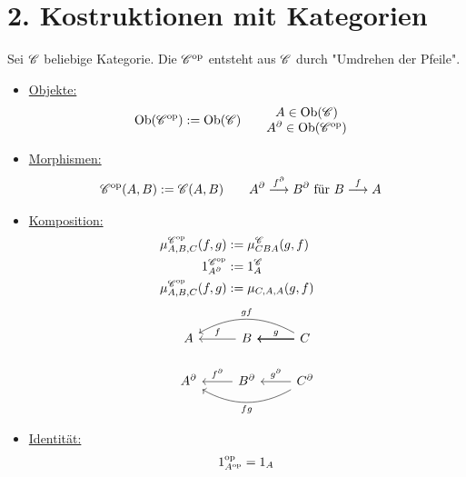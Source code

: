 
\chapter{2. Kostruktionen mit Kategorien}

\begin{definition}
	Sei $\mathscr C$ beliebige Kategorie.
	Die  $\mathscr C^{\text{op}}$ entsteht aus $\mathscr C$ durch "Umdrehen der Pfeile".
	\begin{itemize}
		\item \ul{Objekte:}
			\begin{align*}
				\operatorname{Ob}(\mathscr C^{\text{op}})&:=\operatorname{Ob}(\mathscr C)\qquad\begin{matrix}
						A\in\operatorname{Ob}(\mathscr C)\\
						A^\partial\in\operatorname{Ob}(\mathscr C^{\text{op}})
						\end{matrix}
			\end{align*}
		\item \ul{Morphismen:}
			\begin{align*}
				\mathscr C^{\text{op}}(A,B)&:=\mathscr C(A,B)\qquad
						A^\partial\overset{f^\partial}{\longrightarrow}B^\partial\text{ für }B\overset{f}{\longrightarrow}A
			\end{align*}
		\item \ul{Komposition:}
			\begin{align*}
				\mu_{A,B,C}^{\mathscr C^{\text{op}}}(f,g)&:=\mu_{CBA}^\mathscr C(g,f)\qquad\\
				1_{A^\partial}^{\mathscr C^{\text{op}}}&:=1_A^\mathscr C\\
				\mu_{A,B,C}^{\mathscr C^{\text{op}}}(f,g) &:= \mu_{C,A,A}(g,f)\\
			\end{align*}
		\begin{align*}
				\begin{tikzcd}[ampersand replacement=\&]
					A \& B \arrow[l, "f"'] \& C \arrow[l, "g"'] \arrow[l] \arrow[l] \arrow[ll, "gf"', bend right]\\
					A^{\partial} \& B^{\partial} \arrow[l, "f^{\partial}"'] \& C^{\partial} \arrow[l, "g^{\partial}"'] \arrow[ll, "fg", bend left]
				\end{tikzcd}
			\end{align*}
		\item \ul{Identität:}
			\begin{align*}
				1_{A^{\text{op}}}^{\text{op}} = 1_A
			\end{align*}
	\end{itemize}
\end{definition}